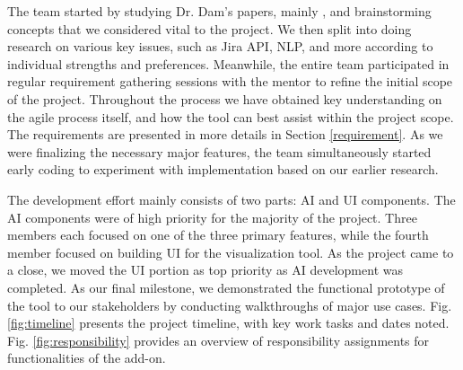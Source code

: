 The team started by studying Dr. Dam's papers, mainly \cite{dam1}, and brainstorming concepts that we considered vital to the project. We then split into doing research on various key issues, such as Jira API, NLP, and more according to individual strengths and preferences. Meanwhile, the entire team participated in regular requirement gathering sessions with the mentor to refine the initial scope of the project. Throughout the process we have obtained key understanding on the agile process itself, and how the tool can best assist within the project scope. The requirements are presented in more details in Section \ref{requirement}. As we were finalizing the necessary major features, the team simultaneously started early coding to experiment with implementation based on our earlier research. 

The development effort mainly consists of two parts: AI and UI components.  The AI components were of high priority for the majority of the project. Three members each focused on one of the three primary features, while the fourth member focused on building UI for the visualization tool. As the project came to a close, we moved the UI portion as top priority as AI development was completed. As our final milestone, we demonstrated the functional prototype of the tool to our stakeholders by conducting walkthroughs of major use cases. Fig. \ref{fig:timeline} presents the project timeline, with key work tasks and dates noted. Fig. \ref{fig:responsibility} provides an overview of responsibility assignments for functionalities of the add-on.

